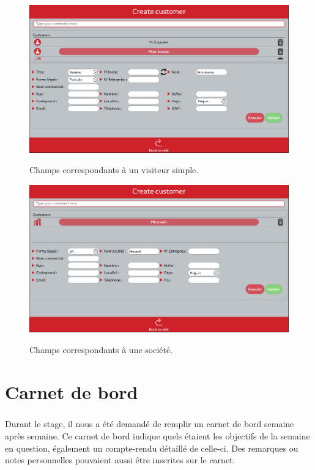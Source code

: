 \documentclass[12pt]{report}
\begin{document}
\begin{figure}[H]
	\caption{Champs correspondants à un visiteur simple.}
	\includegraphics[width=\linewidth]{img/image_customer_1}
	\label{image_customer_1}
\end{figure}

\begin{figure}[H]
	\caption{Champs correspondants à une société.}
	\includegraphics[width=\linewidth]{img/image_customer_2}
	\label{image_customer_2}
\end{figure}

\chapter{Carnet de bord}
\paragraph{}
Durant le stage, il nous a été demandé de remplir un carnet de bord semaine après semaine.
Ce carnet de bord indique quels étaient les objectifs de la semaine en question, également un compte-rendu détaillé de celle-ci. Des remarques ou notes personnelles pouvaient aussi être inscrites sur le carnet.
\end{document}
